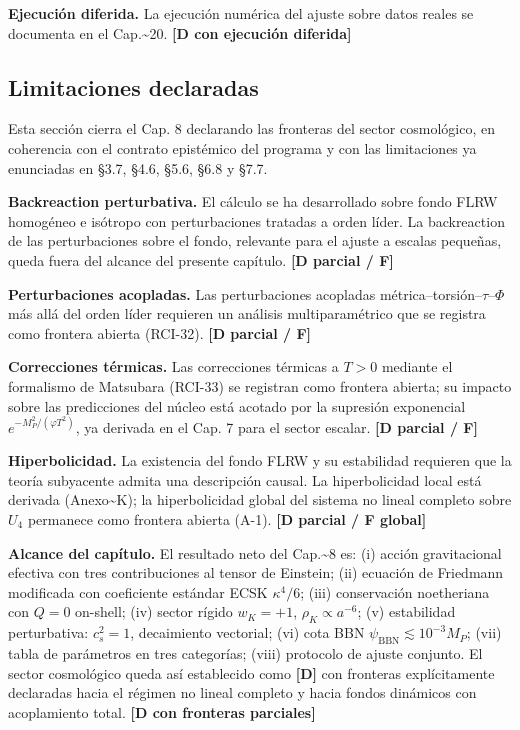 ﻿\documentclass[11pt,letterpaper]{article}
\begin{document}
\textbf{Ejecución diferida.} La ejecución numérica del ajuste sobre datos reales se documenta en el Cap.\textasciitilde{}20. \textbf{[D con ejecución diferida]}
\subsection{Limitaciones declaradas}
Esta sección cierra el Cap. 8 declarando las fronteras del sector cosmológico, en coherencia con el contrato epistémico del programa y con las limitaciones ya enunciadas en §3.7, §4.6, §5.6, §6.8 y §7.7.

\textbf{Backreaction perturbativa.} El cálculo se ha desarrollado sobre fondo FLRW homogéneo e isótropo con perturbaciones tratadas a orden líder. La backreaction de las perturbaciones sobre el fondo, relevante para el ajuste a escalas pequeñas, queda fuera del alcance del presente capítulo. \textbf{[D parcial / F]}

\textbf{Perturbaciones acopladas.} Las perturbaciones acopladas métrica--torsión--$\tau$--$\Phi$ más allá del orden líder requieren un análisis multiparamétrico que se registra como frontera abierta (RCI-32). \textbf{[D parcial / F]}

\textbf{Correcciones térmicas.} Las correcciones térmicas a $T > 0$ mediante el formalismo de Matsubara (RCI-33) se registran como frontera abierta; su impacto sobre las predicciones del núcleo está acotado por la supresión exponencial $e^{-M_P^2/(\varphi T^2)}$, ya derivada en el Cap. 7 para el sector escalar. \textbf{[D parcial / F]}

\textbf{Hiperbolicidad.} La existencia del fondo FLRW y su estabilidad requieren que la teoría subyacente admita una descripción causal. La hiperbolicidad local está derivada (Anexo\textasciitilde{}K); la hiperbolicidad global del sistema no lineal completo sobre $U_4$ permanece como frontera abierta (A-1). \textbf{[D parcial / F global]}

\textbf{Alcance del capítulo.} El resultado neto del Cap.\textasciitilde{}8 es: (i) acción gravitacional efectiva con tres contribuciones al tensor de Einstein; (ii) ecuación de Friedmann modificada con coeficiente estándar ECSK $\kappa^4/6$; (iii) conservación noetheriana con $Q = 0$ on-shell; (iv) sector rígido $w_K = +1$, $\rho_K \propto a^{-6}$; (v) estabilidad perturbativa: $c_s^2 = 1$, decaimiento vectorial; (vi) cota BBN $\psi_{\text{BBN}} \lesssim 10^{-3}M_P$; (vii) tabla de parámetros en tres categorías; (viii) protocolo de ajuste conjunto. El sector cosmológico queda así establecido como \textbf{[D]} con fronteras explícitamente declaradas hacia el régimen no lineal completo y hacia fondos dinámicos con acoplamiento total. \textbf{[D con fronteras parciales]}
\end{document}
